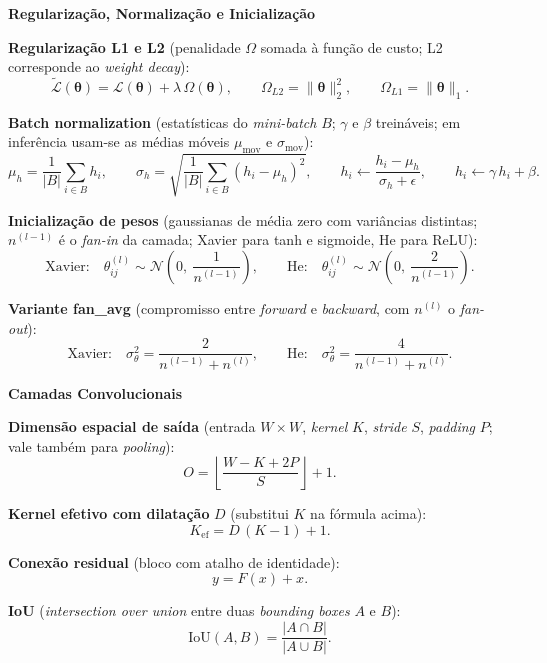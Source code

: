 \documentclass[11pt,a4paper]{article}
\newcommand{\thetav}{\boldsymbol{\theta}}
\newcommand{\bloco}[1]{%
  \par\vspace{0.3em}%
  {\bfseries\large #1}\par%
  \vspace{-0.4em}{\color{gray!60}\rule{\linewidth}{0.4pt}}\par%
}
\begin{document}
\bloco{Regularização, Normalização e Inicialização}

\textbf{Regularização L1 e L2} (penalidade $\Omega$ somada à função de custo; L2 corresponde ao \textit{weight decay}):
\[
  \tilde{\mathcal{L}}(\thetav) = \mathcal{L}(\thetav) + \lambda\,\Omega(\thetav),
  \qquad
  \Omega_{L2} = \lVert\thetav\rVert_2^{2},
  \qquad
  \Omega_{L1} = \lVert\thetav\rVert_1.
\]

\textbf{Batch normalization} (estatísticas do \textit{mini-batch} $B$; $\gamma$ e $\beta$ treináveis; em inferência usam-se as médias móveis $\mu_{\text{mov}}$ e $\sigma_{\text{mov}}$):
\[
  \mu_h = \frac{1}{|B|}\sum_{i \in B} h_i,
  \qquad
  \sigma_h = \sqrt{\frac{1}{|B|}\sum_{i \in B} (h_i - \mu_h)^2},
  \qquad
  h_i \leftarrow \frac{h_i - \mu_h}{\sigma_h + \epsilon},
  \qquad
  h_i \leftarrow \gamma\,h_i + \beta.
\]

\textbf{Inicialização de pesos} (gaussianas de média zero com variâncias distintas; $n^{(l-1)}$ é o \textit{fan-in} da camada; Xavier para tanh e sigmoide, He para ReLU):
\[
  \text{Xavier:}\quad \theta^{(l)}_{ij} \sim \mathcal{N}\!\left(0,\ \frac{1}{n^{(l-1)}}\right),
  \qquad
  \text{He:}\quad \theta^{(l)}_{ij} \sim \mathcal{N}\!\left(0,\ \frac{2}{n^{(l-1)}}\right).
\]

\textbf{Variante fan\_avg} (compromisso entre \textit{forward} e \textit{backward}, com $n^{(l)}$ o \textit{fan-out}):
\[
  \text{Xavier:}\quad \sigma_\theta^{2} = \frac{2}{n^{(l-1)} + n^{(l)}},
  \qquad
  \text{He:}\quad \sigma_\theta^{2} = \frac{4}{n^{(l-1)} + n^{(l)}}.
\]

\bloco{Camadas Convolucionais}

\textbf{Dimensão espacial de saída} (entrada $W \times W$, \textit{kernel} $K$, \textit{stride} $S$, \textit{padding} $P$; vale também para \textit{pooling}):
\[
  O = \left\lfloor \frac{W - K + 2P}{S} \right\rfloor + 1.
\]

\textbf{Kernel efetivo com dilatação} $D$ (substitui $K$ na fórmula acima):
\[
  K_{\text{ef}} = D\,(K - 1) + 1.
\]

\textbf{Conexão residual} (bloco com atalho de identidade):
\[
  y = F(x) + x.
\]

\textbf{IoU} (\textit{intersection over union} entre duas \textit{bounding boxes} $A$ e $B$):
\[
  \mathrm{IoU}(A, B) = \frac{|A \cap B|}{|A \cup B|}.
\]
\end{document}
